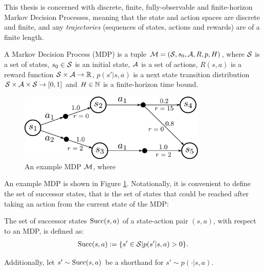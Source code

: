     This thesis is concerned with discrete, finite, fully-observable and finite-horizon Markov Decision Processes, meaning that the state and action spaces are discrete and finite, and any \textit{trajectories} (sequences of states, actions and rewards) are of a finite length. 

    \begin{defn}
        \label{def:mdp}
        A \textnormal{Markov Decision Process} (MDP) is a tuple $\mathcal{M}=(\mathcal{S},s_0,\mathcal{A},R,p,H)$, where $\mathcal{S}$ is a set of states, $s_0\in\mathcal{S}$ is an initial state, $\mathcal{A}$ is a set of actions, $R(s,a)$ is a reward function $\mathcal{S}\times \mathcal{A}\rightarrow \mathbb{R}$, $p(s' | s,a)$ is a next state transition distribution $\mathcal{S} \times \mathcal{A} \times \mathcal{S} \rightarrow [0,1]$ and $H\in\mathbb{N}$ is a finite-horizon time bound. 
    \end{defn}

    \begin{figure}
        \centering\includegraphics[width=0.8\textwidth]{figures/ch2/example_mdp.pdf} 
        \caption[An example MDP $\cl{M}$.]{An example MDP $\cl{M}$, where }
        \label{fig:mdp_eg}
    \end{figure}

    An example MDP is shown in Figure \ref{fig:mdp_eg}. Notationally, it is convenient to define the set of successor states, that is the set of states that could be reached after taking an action from the current state of the MDP:
    \begin{defn}
        \label{def:succ}
        The set of \textnormal{successor states} ${\textnormal{Succ}(s,a)}$ of a state-action pair $(s,a)$, with respect to an MDP, is defined as: 
        \begin{align}
            {\textnormal{Succ}(s,a)}:=\{s'\in\mathcal{S}|p(s'|s,a)>0\}. \label{eq:succ_def}
        \end{align}
        
        Additionally, let $s'\sim {\textnormal{Succ}(s,a)}$ be a shorthand for $s'\sim p(\cdot|s,a)$.
    \end{defn}

